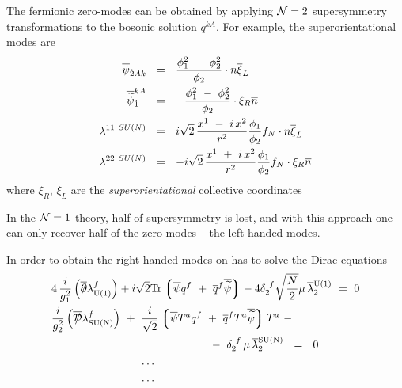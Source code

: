 \documentclass[12pt,letterpaper,landscape,KOMA,smallheadings,calcdimensions,display]{powersem}
\newcommand{\xir}{\xi_R}
\newcommand{\xil}{\xi_L}
\newcommand{\nbar}{\ov{n}}
\begin{document}
\begin{slide}

	The fermionic zero-modes can be obtained by applying $ \mathcal{N}=2 $ supersymmetry transformations
	to the bosonic solution $ q^{kA} $.
	For example, the superorientational modes are
\begin{align*}
%
\notag
\overline{\psi}_{\dot{2}Ak} & ~~=~~ \frac{\phi_1^2 ~-~ \phi_2^2}{\phi_2} \cdot n \overline{\xi}_L   \\
%
\notag
\overline{\wt{\psi}}_{\dot{1}}^{kA}  & ~~=~~ - \frac{\phi_1^2 ~-~ \phi_2^2}{\phi_2} \cdot \xi_R \nbar  \\
%
\lambda^{11\ SU(N)} & ~~=~~ i \sqrt{2}\, \frac{ x^1 ~-~ i\, x^2 }{r^2} \frac{\phi_1}{\phi_2} f_N \cdot n \overline{\xi}_L \\
%
\notag
\lambda^{22\ SU(N)} & ~~=~~ - i \sqrt{2}\, \frac{ x^1 ~+~ i\, x^2 }{r^2} \frac{\phi_1}{\phi_2} f_N \cdot \xi_R \nbar 
\end{align*}
	where $ \xir $, $ \xil $ are the \emph{superorientational} collective coordinates
\end{slide}

\begin{slide}
	In the $\mathcal{N}=1 $ theory, half of supersymmetry is lost, and with this approach one
	can only recover half of the zero-modes -- the left-handed modes.

	In order to obtain the right-handed modes on has to solve the Dirac equations
\begin{align*}
%
	&
	4\, \frac{i}{g_1^2} \left(\ov{\slashed{\p}} \lambda^{f}_{\rm U(1)} \right)
	+ i\sqrt{2} {\rm Tr} \lgr \ov{\psi} q^f ~+~ \ov{q}{}^f \ov{\wt{\psi}} \rgr 
		- 4 \delta_2^{\ f} \sqrt{\frac{N}{2}}\mu\, \ov{\lambda}{}^{\rm U(1)}_{2} ~=~ 0 
	\\
%
	&
	\frac{i}{g_2^2} \left( \ov{\slashed{\md}}\lambda_{\rm SU(N)}^f \right) 
	~+~ \frac{i}{\sqrt{2}} \lgr \ov{\psi} T^a q^f   ~+~  \ov{q}{}^f T^a \ov{\wt{\psi}} \rgr T^a ~-~ \\
%
	&
	\qquad\qquad\qquad\qquad\qquad\qquad\qquad
		~-~ \delta_2^{\ f}\, \mu\, \ov{\lambda}{}_2^{\rm SU(N)} ~~=~~0
	\\
%
	&  \qquad\qquad\qquad\qquad \ldots
	\\
%
	&  \qquad\qquad\qquad\qquad \ldots
\end{align*}
\end{slide}
\end{document}

